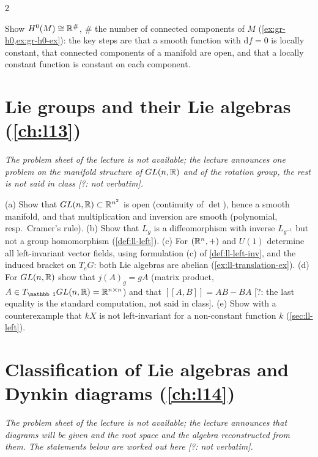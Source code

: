 \begin{paracol}{2}
\begin{exercise}\label{ex:gr-h0-full}
Show $H^0(M)\cong\mathbb{R}^{\#}$, $\#$ the number of connected components of $M$ (\cref{ex:gr-h0,ex:gr-h0-ex}): the key steps are that a smooth function with $\mathrm df=0$ is locally constant, that connected components of a manifold are open, and that a locally constant function is constant on each component.
\end{exercise}

\section{Lie groups and their Lie algebras (\cref{ch:l13})}\label{exam:ch13}

\emph{The problem sheet of the lecture is not available; the lecture announces one problem on the manifold structure of $GL(n,\mathbb{R})$ and of the rotation group, the rest is not said in class [?: not verbatim].}

\begin{exercise}\label{ex:ll-full}
(a) Show that $GL(n,\mathbb{R})\subset\mathbb{R}^{n^2}$ is open (continuity of $\det$), hence a smooth manifold, and that multiplication and inversion are smooth (polynomial, resp.\ Cramer's rule). (b) Show that $L_g$ is a diffeomorphism with inverse $L_{g^{-1}}$ but not a group homomorphism (\cref{def:ll-left}). (c) For $(\mathbb{R}^n,+)$ and $U(1)$ determine all left-invariant vector fields, using formulation (c) of \cref{def:ll-left-inv}, and the induced bracket on $T_eG$: both Lie algebras are abelian (\cref{ex:ll-translation-ex}). (d) For $GL(n,\mathbb{R})$ show that $j(A)_g=gA$ (matrix product, $A\in T_{\mathbb 1}GL(n,\R)=\R^{n\times n}$) and that $[\![A,B]\!]=AB-BA$ [?: the last equality is the standard computation, not said in class]. (e) Show with a counterexample that $kX$ is not left-invariant for a non-constant function $k$ (\cref{sec:ll-left}).
\end{exercise}

\section{Classification of Lie algebras and Dynkin diagrams (\cref{ch:l14})}\label{exam:ch14}

\emph{The problem sheet of the lecture is not available; the lecture announces that diagrams will be given and the root space and the algebra reconstructed from them. The statements below are worked out here [?: not verbatim].}


\end{paracol}

